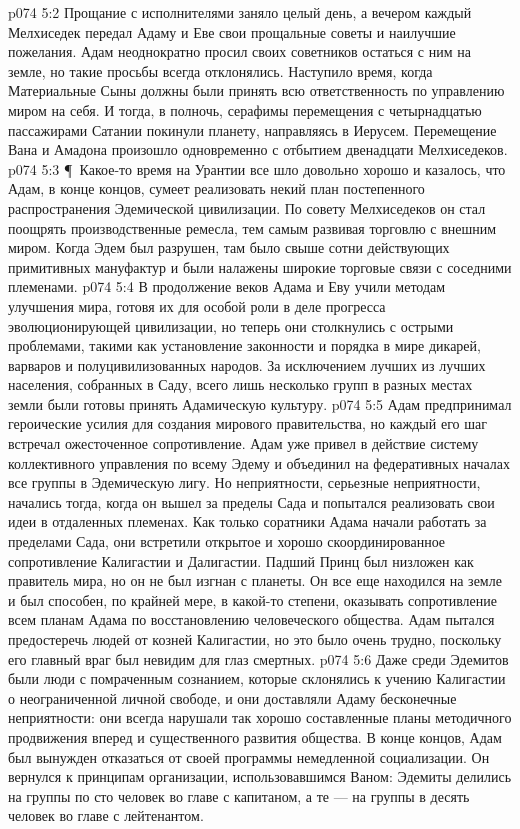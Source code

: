 \vs p074 5:2 Прощание с исполнителями заняло целый день, а вечером каждый Мелхиседек передал Адаму и Еве свои прощальные советы и наилучшие пожелания. Адам неоднократно просил своих советников остаться с ним на земле, но такие просьбы всегда отклонялись. Наступило время, когда Материальные Сыны должны были принять всю ответственность по управлению миром на себя. И тогда, в полночь, серафимы перемещения с четырнадцатью пассажирами Сатании покинули планету, направляясь в Иерусем. Перемещение Вана и Амадона произошло одновременно с отбытием двенадцати Мелхиседеков.
\vs p074 5:3 \P\ Какое\hyp{}то время на Урантии все шло довольно хорошо и казалось, что Адам, в конце концов, сумеет реализовать некий план постепенного распространения Эдемической цивилизации. По совету Мелхиседеков он стал поощрять производственные ремесла, тем самым развивая торговлю с внешним миром. Когда Эдем был разрушен, там было свыше сотни действующих примитивных мануфактур и были налажены широкие торговые связи с соседними племенами.
\vs p074 5:4 В продолжение веков Адама и Еву учили методам улучшения мира, готовя их для особой роли в деле прогресса эволюционирующей цивилизации, но теперь они столкнулись с острыми проблемами, такими как установление законности и порядка в мире дикарей, варваров и полуцивилизованных народов. За исключением лучших из лучших населения, собранных в Саду, всего лишь несколько групп в разных местах земли были готовы принять Адамическую культуру.
\vs p074 5:5 Адам предпринимал героические усилия для создания мирового правительства, но каждый его шаг встречал ожесточенное сопротивление. Адам уже привел в действие систему коллективного управления по всему Эдему и объединил на федеративных началах все группы в Эдемическую лигу. Но неприятности, серьезные неприятности, начались тогда, когда он вышел за пределы Сада и попытался реализовать свои идеи в отдаленных племенах. Как только соратники Адама начали работать за пределами Сада, они встретили открытое и хорошо скоординированное сопротивление Калигастии и Далигастии. Падший Принц был низложен как правитель мира, но он не был изгнан с планеты. Он все еще находился на земле и был способен, по крайней мере, в какой\hyp{}то степени, оказывать сопротивление всем планам Адама по восстановлению человеческого общества. Адам пытался предостеречь людей от козней Калигастии, но это было очень трудно, поскольку его главный враг был невидим для глаз смертных.
\vs p074 5:6 Даже среди Эдемитов были люди с помраченным сознанием, которые склонялись к учению Калигастии о неограниченной личной свободе, и они доставляли Адаму бесконечные неприятности: они всегда нарушали так хорошо составленные планы методичного продвижения вперед и существенного развития общества. В конце концов, Адам был вынужден отказаться от своей программы немедленной социализации. Он вернулся к принципам организации, использовавшимся Ваном: Эдемиты делились на группы по сто человек во главе с капитаном, а те --- на группы в десять человек во главе с лейтенантом.
